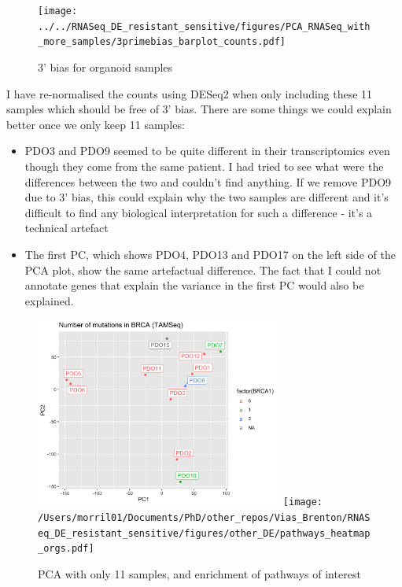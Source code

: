\documentclass{article}
\begin{document}
\begin{figure}[h]
\centering
\texttt{[image: ../../RNASeq\_DE\_resistant\_sensitive/figures/PCA\_RNASeq\_with\_more\_samples/3primebias\_barplot\_counts.pdf]}
\caption{3' bias for organoid samples\label{bias}}
\end{figure}

I have re-normalised the counts using DESeq2 when only including these 11 samples which should be free of 3' bias. There are some things we could explain better once we only keep 11 samples:
\begin{itemize}
\item PDO3 and PDO9 seemed to be quite different in their transcriptomics even though they come from the same patient. I had tried to see what were the differences between the two and couldn't find anything. If we remove PDO9 due to 3' bias, this could explain why the two samples are different and it's difficult to find any biological interpretation for such a difference - it's a technical artefact
\item The first PC, which shows PDO4, PDO13 and PDO17 on the left side of the PCA plot, show the same artefactual difference. The fact that I could not annotate genes that explain the variance in the first PC would also be explained.
\end{itemize}


\begin{figure}[h]
\centering
\includegraphics[width=3.2in]{../../RNASeq_DE_resistant_sensitive/figures/PCA_RNASeq/PCA_counts_subset_BRCA_TAMSeq.png}
\texttt{[image: /Users/morril01/Documents/PhD/other\_repos/Vias\_Brenton/RNASeq\_DE\_resistant\_sensitive/figures/other\_DE/pathways\_heatmap\_orgs.pdf]}
\caption{PCA with only 11 samples, and enrichment of pathways of interest\label{newpca}}
\end{figure}
\end{document}
